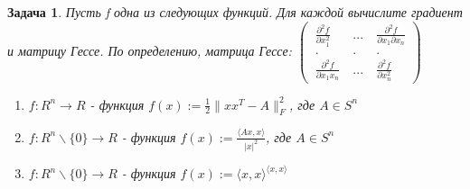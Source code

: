 \documentclass[a4paper]{article}
\newtheorem{problem}{Задача}
\begin{document}
\begin{problem} Пусть f одна из следующих функций. Для каждой вычислите градиент и матрицу Гессе.
\newline По определению, матрица Гессе: \newline
$\begin{pmatrix}
 \ \frac{\partial^2 f}{\partial x_1^2} &\ ... &\  \frac{\partial^2 f}{\partial x_1 \partial x_n }\\
 \ . &\ . &\ . \\
 \ \frac{\partial^2 f}{\partial x_1x_n} &\ ... &\  \frac{\partial^2 f}{\partial x_n^2 }
\end{pmatrix}$
\begin{enumerate}[label=(\alph*)]
\item $f: R^n \rightarrow R$ - функция $f(x) := \frac{1}{2}\|xx^T - A\|^2_F$, где $A \in S^n$
\item $f: R^n \backslash \{0\} \rightarrow R$ - функция $f(x) := \frac{\langle Ax, x \rangle}{|x|^2}$, где $A \in S^n$
\item $f: R^n \backslash \{0\} \rightarrow R$ - функция $f(x) := \langle x, x \rangle ^ {\langle x, x \rangle}$
\end{enumerate}
\end{problem}
\end{document}
